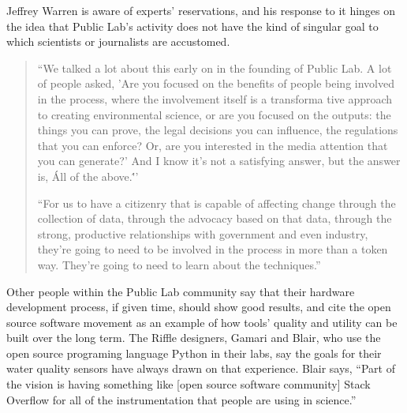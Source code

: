 Jeffrey Warren is aware of experts' reservations, and his response to it hinges
on the idea that Public Lab's activity does not have the kind of singular goal
to which scientists or journalists are accustomed.
\begin{quote}
``We talked a lot about this early on in the founding of Public Lab. A
lot of people asked, 'Are you focused on the benefits of people being
involved in the process, where the involvement itself is a transforma
tive approach to creating environmental science, or are you focused
on the outputs: the things you can prove, the legal decisions you can
influence, the regulations that you can enforce? Or, are you interested
in the media attention that you can generate?' And I know it's
not a satisfying answer, but the answer is, \'All of the above.\'''

``For us to have a citizenry that is capable of affecting change through
the collection of data, through the advocacy based on that data,
through the strong, productive relationships with government and
even industry, they're going to need to be involved in the process
in more than a token way. They're going to need to learn about
the techniques.''
\end{quote}

Other people within the Public Lab community say that their hardware
development process, if given time, should show good results, and cite the
open source software movement as an example of how tools' quality and
utility can be built over the long term. The Riffle designers, Gamari and
Blair, who use the open source programing language Python in their labs,
say the goals for their water quality sensors have always drawn on that experience.
Blair says, ``Part of the vision is having something like [open source
software community] Stack Overflow for all of the instrumentation that
people are using in science.''

